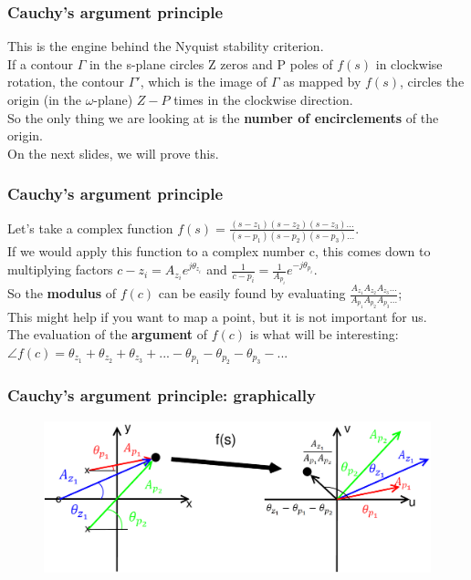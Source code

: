 \begin{frame}
	\frametitle{Cauchy's argument principle}
	\vspace{-7ex}
	This is the engine behind the Nyquist stability criterion.\\
	\medskip
	If a contour $\Gamma$ in the s-plane circles Z zeros and P poles of $f(s)$ in clockwise rotation, the contour $\Gamma'$, which is the image of $\Gamma$ as mapped by $f(s)$, circles the origin (in the $\omega$-plane) $Z-P$ times in the clockwise direction.\\
	\medskip
	So the only thing we are looking at is the \textbf{number of encirclements} of the origin. \\
	On the next slides, we will prove this.
\end{frame}

\begin{frame}
	\frametitle{Cauchy's argument principle}
	\vspace{-3ex}
	Let's take a complex function $f(s)=\frac{(s-z_1)(s-z_2)(s-z_3)...}{(s-p_1)(s-p_2)(s-p_3)...}$.\\
	\medskip
	If we would apply this function to a complex number c, this comes down to multiplying factors $c-z_i = A_{z_{i}}e^{j\theta_{z_{i}}}$ and $\frac{1}{c-p_i}=\frac{1}{A_{p_{i}}}e^{-j\theta_{p_{i}}}$.\\
	\medskip
	So the \textbf{modulus} of $f(c)$ can be easily found by evaluating $\frac{A_{z_{1}}A_{z_{2}}A_{z_{3}}...}{A_{p_{1}}A_{p_{2}}A_{p_{3}}...}$;\\
	\medskip
	This might help if you want to map a point, but it is not important for us.\\
	\medskip
	The evaluation of the \textbf{argument} of $f(c)$ is what will be interesting: $\angle f(c) = \theta_{z_{1}}+\theta_{z_{2}}+\theta_{z_{3}}+...-\theta_{p_{1}}-\theta_{p_{2}}-\theta_{p_{3}}-...$
\end{frame}

\begin{frame}
	\frametitle{Cauchy's argument principle: graphically}
	\begin{figure}
		\includegraphics[width=1.0\linewidth]{graphical}
	\end{figure}
\end{frame}

